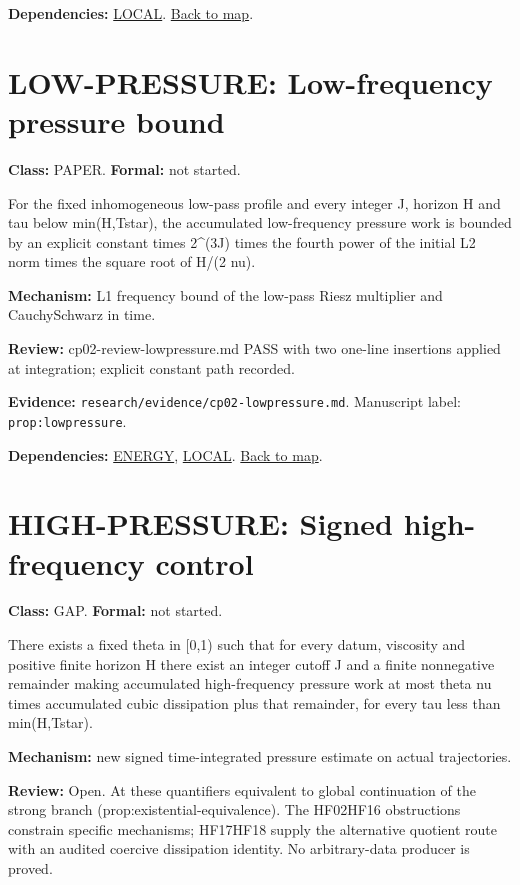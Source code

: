\documentclass[10pt]{article}
\begin{document}
\textbf{Dependencies:} \hyperref[node:LOCAL]{LOCAL}. \hyperref[map]{Back to map}.

\section*{LOW-PRESSURE: Low-frequency pressure bound}\label{node:LOW-PRESSURE}
\textbf{Class:} PAPER. \textbf{Formal:} not started.

For the fixed inhomogeneous low-pass profile and every integer J, horizon H and tau below min(H,Tstar), the accumulated low-frequency pressure work is bounded by an explicit constant times 2\textasciicircum{}(3J) times the fourth power of the initial L2 norm times the square root of H/(2 nu).

\textbf{Mechanism:} L1 frequency bound of the low-pass Riesz multiplier and Cauchy\textendash{}\allowbreak{}Schwarz in time.

\textbf{Review:} cp02-review-lowpressure.md PASS with two one-line insertions applied at integration; explicit constant path recorded.

\textbf{Evidence:} \texttt{research/evidence/cp02-lowpressure.md}. Manuscript label: \texttt{prop:lowpressure}.

\textbf{Dependencies:} \hyperref[node:ENERGY]{ENERGY}, \hyperref[node:LOCAL]{LOCAL}. \hyperref[map]{Back to map}.

\section*{HIGH-PRESSURE: Signed high-frequency control}\label{node:HIGH-PRESSURE}
\textbf{Class:} GAP. \textbf{Formal:} not started.

There exists a fixed theta in [0,1) such that for every datum, viscosity and positive finite horizon H there exist an integer cutoff J and a finite nonnegative remainder making accumulated high-frequency pressure work at most theta nu times accumulated cubic dissipation plus that remainder, for every tau less than min(H,Tstar).

\textbf{Mechanism:} new signed time-integrated pressure estimate on actual trajectories.

\textbf{Review:} Open. At these quantifiers equivalent to global continuation of the strong branch (prop:existential-equivalence). The HF02\textendash{}\allowbreak{}HF16 obstructions constrain specific mechanisms; HF17\textendash{}\allowbreak{}HF18 supply the alternative quotient route with an audited coercive dissipation identity. No arbitrary-data producer is proved.
\end{document}
